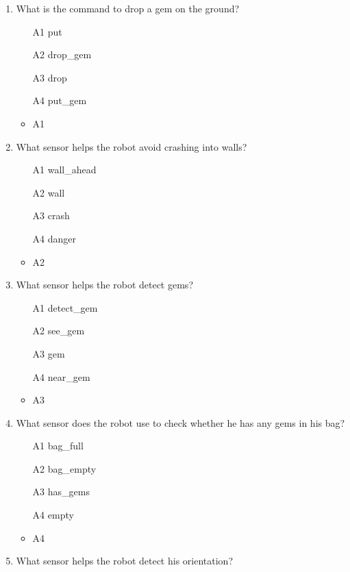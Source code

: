 \documentclass[article,A4,12pt]{llncs}
\begin{document}
\begin{enumerate}
\begin{itemize}
  \end{itemize}
\item What is the command to drop a gem on the ground?
\begin{enumerate}
\item[A1] put
\item[A2] drop\_gem
\item[A3] drop 
\item[A4] put\_gem
\end{enumerate}
  \begin{itemize}
    \item A1
  \end{itemize}
\item What sensor helps the robot avoid crashing into walls?
\begin{enumerate}
\item[A1] wall\_ahead
\item[A2] wall
\item[A3] crash
\item[A4] danger
\end{enumerate}
  \begin{itemize}
    \item A2
  \end{itemize}
\item What sensor helps the robot detect gems?
\begin{enumerate}
\item[A1] detect\_gem
\item[A2] see\_gem
\item[A3] gem
\item[A4] near\_gem
\end{enumerate}
  \begin{itemize}
    \item A3
  \end{itemize}
\item What sensor does the robot use to check whether he has any gems in his bag?
\begin{enumerate}
\item[A1] bag\_full
\item[A2] bag\_empty
\item[A3] has\_gems
\item[A4] empty
\end{enumerate}
  \begin{itemize}
    \item A4
  \end{itemize}
\item What sensor helps the robot detect his orientation?

\end{enumerate}
\end{document}
